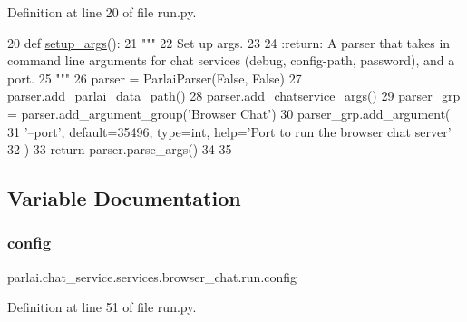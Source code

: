 Definition at line 20 of file run.\+py.


\begin{DoxyCode}
20 \textcolor{keyword}{def }\hyperlink{namespaceparlai_1_1tasks_1_1talkthewalk_1_1run_a3534e8afa0a4dc25a6e02740fa35ac84}{setup\_args}():
21     \textcolor{stringliteral}{"""}
22 \textcolor{stringliteral}{    Set up args.}
23 \textcolor{stringliteral}{}
24 \textcolor{stringliteral}{    :return: A parser that takes in command line arguments for chat services (debug, config-path,
       password), and a port.}
25 \textcolor{stringliteral}{    """}
26     parser = ParlaiParser(\textcolor{keyword}{False}, \textcolor{keyword}{False})
27     parser.add\_parlai\_data\_path()
28     parser.add\_chatservice\_args()
29     parser\_grp = parser.add\_argument\_group(\textcolor{stringliteral}{'Browser Chat'})
30     parser\_grp.add\_argument(
31         \textcolor{stringliteral}{'--port'}, default=35496, type=int, help=\textcolor{stringliteral}{'Port to run the browser chat server'}
32     )
33     \textcolor{keywordflow}{return} parser.parse\_args()
34 
35 
\end{DoxyCode}


\subsection{Variable Documentation}
\mbox{\label{namespaceparlai_1_1chat__service_1_1services_1_1browser__chat_1_1run_aeb1c1b0dde4fbc5d8a57e4224e68c616}} 
\subsubsection{\texorpdfstring{config}{config}}
{\footnotesize\ttfamily parlai.\+chat\+\_\+service.\+services.\+browser\+\_\+chat.\+run.\+config}



Definition at line 51 of file run.\+py.

\mbox{\label{namespaceparlai_1_1chat__service_1_1services_1_1browser__chat_1_1run_a59347589836f32bb41705f1eb7b54e62}} 
